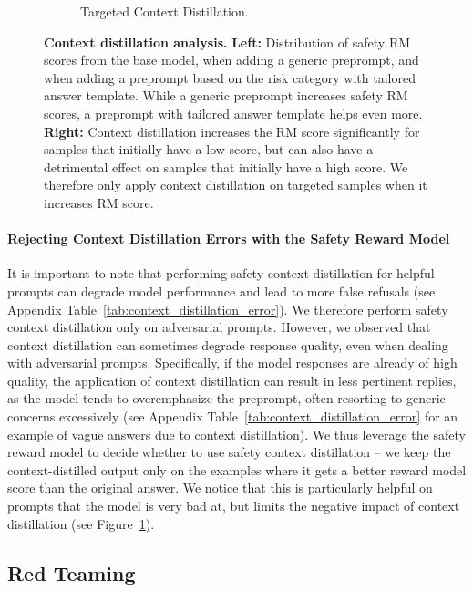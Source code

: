 \begin{figure}[!htbp]
\begin{subfigure}{.5\textwidth}
        \caption{Targeted Context Distillation.}
\label{fig:context_distillation_with_templates_delta_scatter_plot}
    \end{subfigure}
    \caption{\textbf{Context distillation analysis.} \textbf{Left:} Distribution of safety RM scores from the base model, when adding a generic preprompt, and when adding a preprompt based on the risk category with tailored answer template. While a generic preprompt increases safety RM scores, a preprompt with tailored answer template helps even more.
    \textbf{Right:} Context distillation increases the RM score significantly for samples that initially have a low score, but can also have a detrimental effect on samples that initially have a high score. We therefore only apply context distillation on targeted samples when it increases RM score.}
    \label{fig:context_distillation_with_templates}
\end{figure}


\paragraph{Rejecting Context Distillation Errors with the Safety Reward Model}
It is important to note that performing safety context distillation for helpful prompts can degrade model performance and lead to more false refusals (see Appendix Table~\ref{tab:context_distillation_error}). 
We therefore perform safety context distillation only on adversarial prompts.
However, we observed that context distillation can sometimes degrade response quality, even when dealing with adversarial prompts. 
Specifically, if the model responses are already of high quality, the application of context distillation can result in less pertinent replies, as the model tends to overemphasize the preprompt, often resorting to generic concerns excessively (see Appendix Table~\ref{tab:context_distillation_error} for an example of vague answers due to context distillation).
We thus leverage the safety reward model to decide whether to use safety context distillation -- we keep the context-distilled output only on the examples where it gets a better reward model score than the original answer.
We notice that this is particularly helpful on prompts that the model is very bad at, but limits the negative impact of context distillation (see Figure~\ref{fig:context_distillation_with_templates_delta_scatter_plot}).




\subsection{Red Teaming}
\label{sec:red_teaming}

